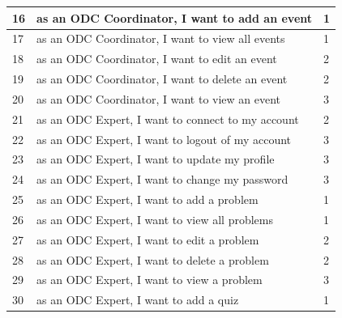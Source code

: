 \begin{longtable}{|l|p{10cm}|l|}
      16                                        & as an ODC Coordinator, I want to add an event            & 1                 \\ \hline
      17                                        & as an ODC Coordinator, I want to view all events         & 1                 \\ \hline
      18                                        & as an ODC Coordinator, I want to edit an event           & 2                 \\ \hline
      19                                        & as an ODC Coordinator, I want to delete an event         & 2                 \\ \hline
      20                                        & as an ODC Coordinator, I want to view an event           & 3                 \\ \hline
      21                                        & as an ODC Expert, I want to connect to my account        & 2                 \\ \hline
      22                                        & as an ODC Expert, I want to logout of my account         & 3                 \\ \hline
      23                                        & as an ODC Expert, I want to update my profile            & 3                 \\ \hline
      24                                        & as an ODC Expert, I want to change my password           & 3                 \\ \hline
      25                                        & as an ODC Expert, I want to add a problem                & 1                 \\ \hline
      26                                        & as an ODC Expert, I want to view all problems            & 1                 \\ \hline
      27                                        & as an ODC Expert, I want to edit a problem               & 2                 \\ \hline
      28                                        & as an ODC Expert, I want to delete a problem             & 2                 \\ \hline
      29                                        & as an ODC Expert, I want to view a problem               & 3                 \\ \hline
      30                                        & as an ODC Expert, I want to add a quiz                   & 1                 \\ \hline

\end{longtable}
